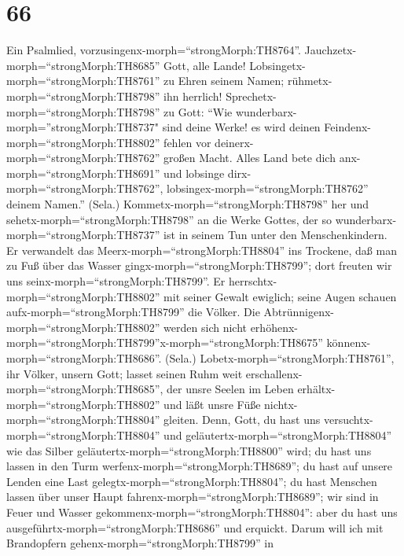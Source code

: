 \hypertarget{section-65}{%
\section{66}\label{section-65}}

 Ein Psalmlied, vorzusingenx-morph=``strongMorph:TH8764''.
Jauchzetx-morph=``strongMorph:TH8685'' Gott, alle Lande! 
Lobsingetx-morph=``strongMorph:TH8761'' zu Ehren seinem Namen;
rühmetx-morph=``strongMorph:TH8798'' ihn herrlich! 
Sprechetx-morph=``strongMorph:TH8798'' zu Gott: ``Wie
wunderbarx-morph=''strongMorph:TH8737" sind deine Werke! es wird deinen
Feindenx-morph=``strongMorph:TH8802'' fehlen vor
deinerx-morph=``strongMorph:TH8762'' großen Macht.  Alles
Land bete dich anx-morph=``strongMorph:TH8691'' und lobsinge
dirx-morph=``strongMorph:TH8762'',
lobsingex-morph=``strongMorph:TH8762'' deinem Namen.'' (Sela.)
 Kommetx-morph=``strongMorph:TH8798'' her und
sehetx-morph=``strongMorph:TH8798'' an die Werke Gottes, der so
wunderbarx-morph=``strongMorph:TH8737'' ist in seinem Tun unter den
Menschenkindern.  Er verwandelt das
Meerx-morph=``strongMorph:TH8804'' ins Trockene, daß man zu Fuß über das
Wasser gingx-morph=``strongMorph:TH8799''; dort freuten wir uns
seinx-morph=``strongMorph:TH8799''.  Er
herrschtx-morph=``strongMorph:TH8802'' mit seiner Gewalt ewiglich; seine
Augen schauen aufx-morph=``strongMorph:TH8799'' die Völker. Die
Abtrünnigenx-morph=``strongMorph:TH8802'' werden sich nicht
erhöhenx-morph=``strongMorph:TH8799''\textbar x-morph=``strongMorph:TH8675''
könnenx-morph=``strongMorph:TH8686''. (Sela.) 
Lobetx-morph=``strongMorph:TH8761'', ihr Völker, unsern Gott; lasset
seinen Ruhm weit erschallenx-morph=``strongMorph:TH8685'', 
der unsre Seelen im Leben erhältx-morph=``strongMorph:TH8802'' und läßt
unsre Füße nichtx-morph=``strongMorph:TH8804'' gleiten. 
Denn, Gott, du hast uns versuchtx-morph=``strongMorph:TH8804'' und
geläutertx-morph=``strongMorph:TH8804'' wie das Silber
geläutertx-morph=``strongMorph:TH8800'' wird;  du hast uns
lassen in den Turm werfenx-morph=``strongMorph:TH8689''; du hast auf
unsere Lenden eine Last gelegtx-morph=``strongMorph:TH8804'';
 du hast Menschen lassen über unser Haupt
fahrenx-morph=``strongMorph:TH8689''; wir sind in Feuer und Wasser
gekommenx-morph=``strongMorph:TH8804'': aber du hast uns
ausgeführtx-morph=``strongMorph:TH8686'' und erquickt. 
Darum will ich mit Brandopfern gehenx-morph=``strongMorph:TH8799'' in
